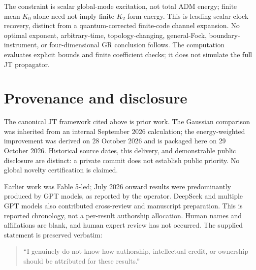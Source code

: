 \documentclass[11pt]{article}
\begin{document}
The constraint is scalar global-mode excitation, not total ADM energy;
finite mean $K_0$ alone need not imply finite $K_2$ form energy.
This is leading scalar-clock recovery, distinct from a quantum-corrected
finite-code channel expansion. No optimal exponent, arbitrary-time,
topology-changing, general-Fock, boundary-instrument, or four-dimensional
GR conclusion follows. The computation evaluates explicit bounds and
finite coefficient checks; it does not simulate the full JT propagator.

\section*{Provenance and disclosure}
The canonical JT framework cited above is prior work. The Gaussian
comparison was inherited from an internal September 2026 calculation;
the energy-weighted improvement was derived on 28 October 2026 and is
packaged here on 29 October 2026. Historical source dates, this delivery,
and demonstrable public disclosure are distinct: a private commit does
not establish public priority. No global novelty certification is claimed.

Earlier work was Fable 5-led; July 2026 onward results were predominantly
produced by GPT models, as reported by the operator. DeepSeek and multiple
GPT models also contributed cross-review and manuscript preparation.
This is reported chronology, not a per-result authorship allocation.
Human names and affiliations are blank, and human expert review has not
occurred. The supplied statement is preserved verbatim:
\begin{quote}
``I genuinely do not know how authorship, intellectual credit, or ownership should be attributed for these results.''
\end{quote}


\end{document}
